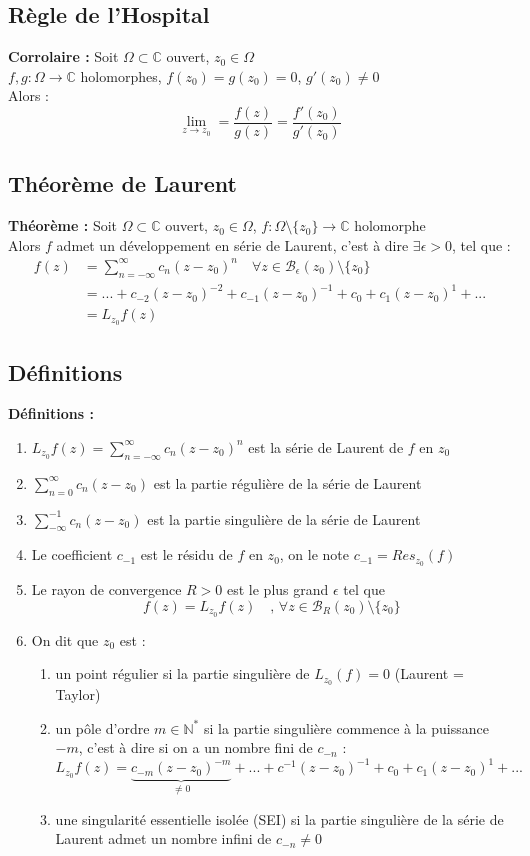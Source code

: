 \subsection{Règle de l'Hospital}
\textbf{Corrolaire :} Soit $\Omega\subset\mathbb{C}$ ouvert, $z_0\in\Omega$\\
$f,g : \Omega\to\mathbb{C}$ holomorphes, $f(z_0) = g(z_0) = 0$, $g'(z_0)\neq0$\\
Alors :
$$\lim_{z \to z_0} = \frac{f(z)}{g(z)} = \frac{f'(z_0)}{g'(z_0)}$$

\subsection{Théorème de Laurent}
\textbf{Théorème :} Soit $\Omega\subset\mathbb{C}$ ouvert, $z_0\in\Omega$, $f : \Omega\setminus\{z_0\}\to\mathbb{C}$ holomorphe\\
Alors $f$ admet un développement en série de Laurent, c'est à dire $\exists\epsilon>0$, tel que :
\begin{align*}
    f(z) &= \sum_{n=-\infty}^{\infty}c_n(z-z_0)^n \quad \forall z \in \mathcal{B}_\epsilon(z_0)\setminus\{z_0\} \\
    &=...+c_{-2}(z-z_0)^{-2}+c_{-1}(z-z_0)^{-1}+c_0+c_1(z-z_0)^1+... \\
    &= L_{z_0}f(z)
\end{align*}

\subsection{Définitions}
\textbf{Définitions :}
\begin{enumerate}
    \item $L_{z_0}f(z) = \sum_{n=-\infty}^{\infty}c_n(z-z_0)^n$ est la série de Laurent de $f$ en $z_0$
    \item $\sum_{n=0}^{\infty}c_n(z-z_0)$ est la partie régulière de la série de Laurent
    \item $\sum_{-\infty}^{-1}c_n(z-z_0)$ est la partie singulière de la série de Laurent
    \item Le coefficient $c_{-1}$ est le résidu de $f$ en $z_0$, on le note $c_{-1} = Res_{z_0}(f)$
    \item Le rayon de convergence $R>0$ est le plus grand $\epsilon$ tel que
    $$f(z) = L_{z_0}f(z) \quad \text{, } \forall z \in \mathcal{B}_R(z_0) \setminus \{z_0\}$$
    \item On dit que $z_0$ est :
    \begin{enumerate}
        \item un point régulier si la partie singulière de $L_{z_0}(f) = 0$ (Laurent = Taylor)
        \item un pôle d'ordre $m \in \mathbb{N}^*$ si la partie singulière commence à la puissance $-m$, c'est à dire si on a un nombre fini de $c_{-n}$ :
        $$L_{z_0}f(z) = \underbrace{c_{-m}(z-z_0)^{-m}}_{\neq0}+...+c^{-1}(z-z_0)^{-1}+c_0+c_1(z-z_0)^1+...$$
        \item une singularité essentielle isolée (SEI) si la partie singulière de la série de Laurent admet un nombre infini de $c_{-n} \neq 0$
    \end{enumerate}
\end{enumerate}

